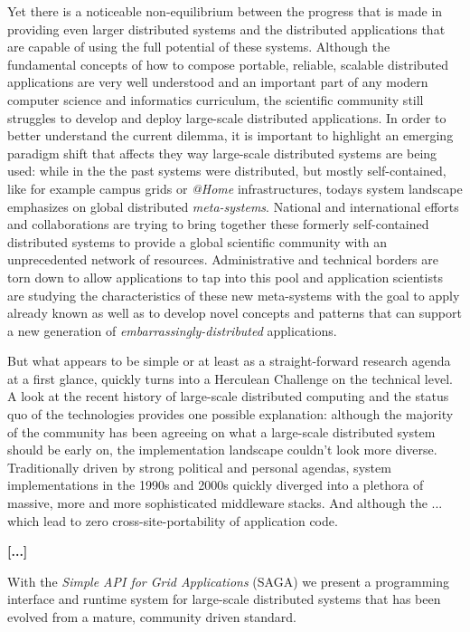 \documentclass[a4paper,10pt]{article}
\begin{document}
 Yet there is a noticeable non-equilibrium between the progress that
 is made in providing even larger distributed systems and the
 distributed applications that are capable of using the full potential
 of these systems. Although the fundamental concepts of how to compose
 portable, reliable, scalable distributed applications are very well
 understood and an important part of any modern computer science and
 informatics curriculum, the scientific community still struggles to
 develop and deploy large-scale distributed applications.  In order to
 better understand the current dilemma, it is important to highlight
 an emerging paradigm shift that affects they way large-scale
 distributed systems are being used: while in the the past systems
 were distributed, but mostly self-contained, like for example campus
 grids or \textit{@Home} infrastructures, todays system landscape
 emphasizes on global distributed \textit{meta-systems}.  National and
 international efforts and collaborations are trying to bring together
 these formerly self-contained distributed systems to provide a global
 scientific community with an unprecedented network of
 resources. Administrative and technical borders are torn down to
 allow applications to tap into this pool and application scientists
 are studying the characteristics of these new meta-systems with the
 goal to apply already known as well as to develop novel concepts and
 patterns that can support a new generation of
 \textit{embarrassingly-distributed} applications.
 
 But what appears to be simple or at least as a straight-forward
 research agenda at a first glance, quickly turns into a Herculean
 Challenge on the technical level. A look at the recent history of
 large-scale distributed computing and the status quo of the
 technologies provides one possible explanation: although the majority
 of the community has been agreeing on what a large-scale distributed
 system should be early on, the implementation landscape couldn't look
 more diverse. Traditionally driven by strong political and personal
 agendas, system implementations in the 1990s and 2000s quickly
 diverged into a plethora of massive, more and more sophisticated
 middleware stacks.  And although the ... which lead to zero
 cross-site-portability of application code.
 
{\bf [...] }
 
 
 
 With the \textit{Simple API for Grid Applications} (SAGA) we present a programming interface and
 runtime system for large-scale distributed systems that has been evolved from a mature, community 
 driven standard. 
 
\end{document}

